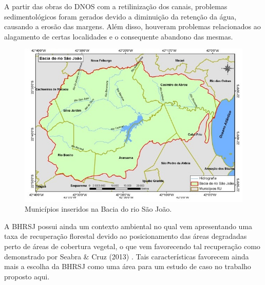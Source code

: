 A partir das obras do DNOS com a retilinização dos canais, problemas sedimentológicos foram gerados devido a diminuição da retenção da água, causando a erosão das margens. Além disso, houveram problemas relacionados ao alagamento de certas localidades e o consequente abandono das mesmas. \\

	\begin{figure}
		\centering
		\includegraphics[width=0.9\linewidth]{data/BHRSJ_2}
		\caption{Municípios inseridos na Bacia do rio São João.}
		\label{fig:bhrsj2}
	\end{figure}


A BHRSJ possui ainda um contexto ambiental no qual vem apresentando uma taxa de recuperação florestal devido ao posicionamento das áreas degradadas perto de áreas de cobertura vegetal, o que vem favorecendo tal recuperação como demonstrado por Seabra \& Cruz (2013) \cite{SEABRA_CRUZ}. Tais características favorecem ainda mais a escolha da BHRSJ como uma área para um estudo de caso no trabalho proposto aqui. \\
